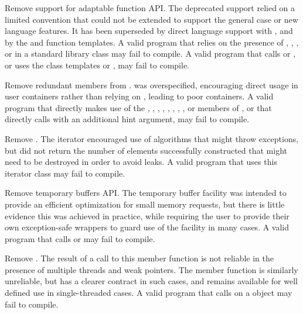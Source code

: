 \nodiffref
\change Remove support for adaptable function API.
\rationale
The deprecated support relied on a limited convention that could not be
extended to support the general case or new language features. It has been
superseded by direct language support with , and by the
 and  function templates.
\effect
A valid \CppXVII{} program that relies on the presence of ,
, , or
 in a standard library class may fail to compile. A
valid \CppXVII{} program that calls  or , or uses the
class templates  or , may fail to
compile.

\nodiffref
\change Remove redundant members from .
\rationale
{} was overspecified, encouraging direct usage in user containers
rather than relying on , leading to poor containers.
\effect
A valid \CppXVII{} program that directly makes use of the ,
, , ,
, , , , or
 members of , or that directly calls
 with an additional hint argument, may fail to compile.

\nodiffref
\change Remove .
\rationale
The iterator encouraged use of algorithms that might throw exceptions, but did
not return the number of elements successfully constructed that might need to
be destroyed in order to avoid leaks.
\effect
A valid \CppXVII{} program that uses this iterator class may fail to compile.

\nodiffref
\change Remove temporary buffers API.
\rationale
The temporary buffer facility was intended to provide an efficient optimization
for small memory requests, but there is little evidence this was achieved in
practice, while requiring the user to provide their own exception-safe wrappers
to guard use of the facility in many cases.
\effect
A valid \CppXVII{} program that calls  or
 may fail to compile.

\nodiffref
\change Remove .
\rationale
The result of a call to this member function is not reliable in the presence of
multiple threads and weak pointers. The member function  is
similarly unreliable, but has a clearer contract in such cases, and remains
available for well defined use in single-threaded cases.
\effect
A valid \CppXVII{} program that calls  on a 
object may fail to compile.

